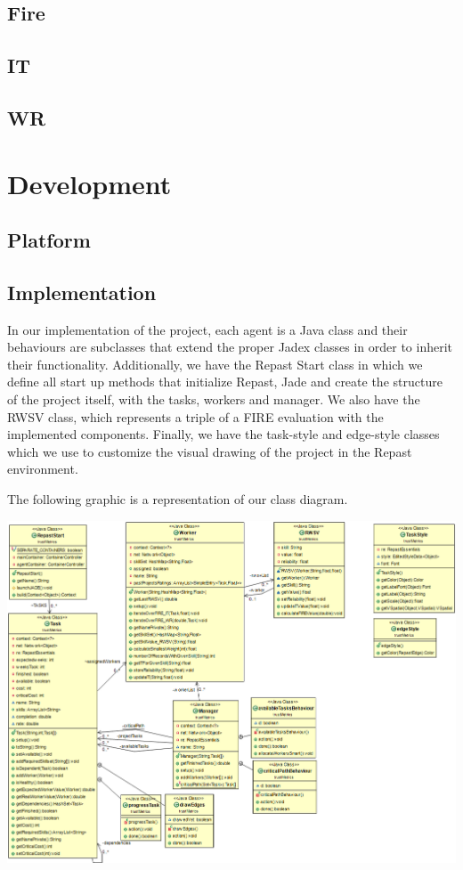 \documentclass[paper=a4, fontsize=11pt]{scrartcl} %
\numberwithin{equation}{section} %
\numberwithin{figure}{section} %
\numberwithin{table}{section} %
\begin{document}
\subsection{Fire}

\subsection{IT}
\subsection{WR}

\section{Development}

\subsection{Platform}

\subsection{Implementation}
In our implementation of the project, each agent is a Java class and their behaviours are subclasses that extend the proper Jadex classes in order to inherit their functionality. Additionally, we have the Repast Start class in which we define all start up methods that initialize Repast, Jade and create the structure of the project itself, with the tasks, workers and manager. We also have the RWSV class, which represents a triple of a FIRE evaluation with the implemented components. Finally, we have the task-style and edge-style classes which we use to customize the visual drawing of the project in the Repast environment.

The following graphic is a representation of our class diagram.
\begin{center}
	\includegraphics[scale=0.4]{Model.png}
\end{center}
\end{document}
